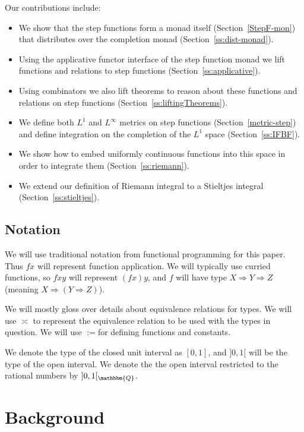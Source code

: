 \documentclass{elsarticle}
\newcommand{\assign}{:=}
\begin{document}
Our contributions include:
\begin{itemize}
  \item We show that the step functions form a monad itself
  (Section~\ref{StepF-mon}) that distributes over the completion monad
  (Section~\ref{ss:dist-monad}).
  
  \item Using the applicative functor interface of the step function monad we
  lift functions and relations to step functions
  (Section~\ref{ss:applicative}).
  
  \item Using combinators we also lift theorems to reason about these
  functions and relations on step functions
  (Section~\ref{ss:liftingTheorems}).
  
  \item We define both $L^1$ and $L^{\infty}$ metrics on step functions
  (Section~\ref{metric-step}) and define integration on the completion of the
  $L^1$ space (Section~\ref{ss:IFBF}).
  
  \item We show how to embed uniformly continuous functions into this space in
  order to integrate them (Section~\ref{ss:riemann}).
  
  \item We extend our definition of Riemann integral to a Stieltjes integral
  (Section~\ref{ss:stieltjes}).
\end{itemize}
\subsection{Notation}We will use traditional notation from functional
programming for this paper. Thus $f x$ will represent function application. We
will typically use curried functions, so $f x y$ will represent $(f x) y$, and
$f$ will have type $X \Rightarrow Y \Rightarrow Z$ (meaning $X \Rightarrow (Y
\Rightarrow Z)$).

We will mostly gloss over details about equivalence relations for types. We
will use $\asymp$ to represent the equivalence relation to be used with the
types in question. We will use $\assign$for defining functions and constants.

We denote the type of the closed unit interval as $[0, 1]$, and $] 0, 1 [$
will be the type of the open interval. We denote the the open interval
restricted to the rational numbers by $] 0, 1 [_{\mathbbm{Q}}$.

\section{Background}
\end{document}
